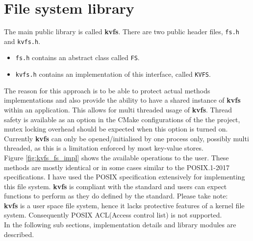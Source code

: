 \documentclass[bsc,frontabs,twoside,singlespacing,parskip,deptreport]{infthesis}     %
\begin{document}
{\section{File system library} \label{kvfs_library}
The main public library is called {\bf kvfs}. There are two public header files,  {\tt fs.h} and {\tt kvfs.h}. 
\begin{itemize}
	\item {\tt fs.h} contains an abstract class called {\tt FS}.
	\item {\tt kvfs.h} contains an implementation of this interface, called {\tt KVFS}.
\end{itemize}
The reason for this approach is to be able to protect actual methods implementations and also provide the ability to have a shared instance of {\bf kvfs} within an application. This allows for multi threaded usage of {\bf kvfs}. Thread safety is available as an option in the CMake configurations of the the project, mutex locking overhead should be expected when this option is turned on.\\
Currently {\bf kvfs} can only be opened/initialised by one process only, possibly multi threaded, as this is a limitation enforced by most key-value stores.
\\
Figure \ref{fig:kvfs_fs_impl} shows the available operations to the user. These methods are mostly identical or in some cases similar to the POSIX.1-2017 ~\cite{POSIX} specifications. I have used the POSIX specification extensively for implementing this file system. {\bf kvfs} is compliant with the standard and users can expect functions to perform as they do defined by the standard. 
Please take note:
\\{\bf kvfs} is a user space file system, hence it lacks protective features of a kernel file system. Consequently POSIX ACL(Access control list) is not supported.
\\In the following sub sections, implementation details and library modules are described.

}
\end{document}
